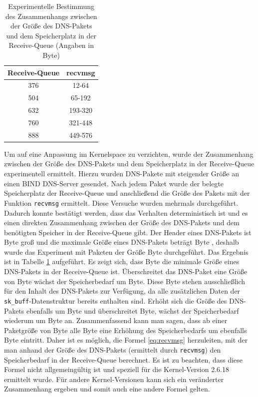 \documentclass[a4paper, 12pt, BCOR10mm, DIV12, toc=bibliography, toc=listof, german]{scrbook}
\begin{document}
		\begin{table}
			\centering
			\begin{tabular}{|c|c|}\hline
				Receive-Queue & recvmsg \\\hline\hline
				376 & 12-64	\\
				504 & 65-192	\\
				632 & 193-320	\\
				760 & 321-448 \\
				888 &	449-576\\\hline
			\end{tabular}
			\caption{Experimentelle Bestimmung des Zusammenhangs zwischen der Größe des DNS-Pakets und dem
			Speicherplatz in der Receive-Queue (Angaben in Byte)}
			\label{tab:recvmsg}
		\end{table}

		Um auf eine Anpassung im Kernelspace zu verzichten, wurde der Zusammenhang zwischen der Größe
		des DNS-Pakets und dem Speicherplatz in der Receive-Queue experimentell ermittelt. Hierzu
		wurden DNS-Pakete mit steigender Größe an einen BIND DNS-Server gesendet. Nach jedem Paket wurde
		der belegte Speicherplatz der Receive-Queue und anschließend die Größe des Pakets mit
		der Funktion \texttt{recvmsg} ermittelt. Diese Versuche wurden mehrmals durchgeführt. Dadurch
		konnte bestätigt werden, dass das Verhalten deterministisch ist und es einen direkten Zusammenhang
		zwischen der Größe des DNS-Pakets und dem benötigten Speicher in der Receive-Queue gibt. Der
		Header eines DNS-Pakets ist \unit[12]{Byte} groß und die maximale Größe eines DNS-Pakets beträgt
		\unit[512]{Byte}
		\cite{rfc1035}, deshalb wurde das Experiment mit Paketen der Größe \unit[12-576]{Byte} durchgeführt. Das
		Ergebnis ist in Tabelle \ref{tab:recvmsg} aufgeführt. Es zeigt sich, dass \unit[376]{Byte} die minimale
		Größe eines DNS-Pakets in der Receive-Queue ist. Überschreitet das DNS-Paket eine Größe von
		\unit[64]{Byte} wächst der Speicherbedarf um \unit[128]{Byte}. Diese \unit[128]{Byte} stehen ausschließlich für den Inhalt
		des DNS-Pakets zur Verfügung, da alle zusätzlichen Daten der \texttt{sk\_buff}-Datenstruktur
		bereits enthalten sind. Erhöht sich die Größe des DNS-Pakets ebenfalls um \unit[128]{Byte} und
		überschreitet \unit[192]{Byte}, wächst der Speicherbedarf wiederum um \unit[128]{Byte} an. Zusammenfassend
		kann man sagen, dass ab einer Paketgröße von \unit[64]{Byte} alle \unit[128]{Byte} eine Erhöhung des
		Speicherbedarfs um ebenfalls \unit[128]{Byte} eintritt. Daher ist es möglich, die Formel \ref{eq:recvmsg}
		herzuleiten, mit der man anhand der Größe des DNS-Pakets (ermittelt durch \texttt{recvmsg}) den
		Speicherbedarf in der Receive-Queue berechnet. Es ist zu beachten, dass diese Formel nicht
		allgemeingültig ist und speziell für die Kernel-Version 2.6.18 ermittelt wurde. Für andere
		Kernel-Versionen kann sich ein veränderter Zusammenhang ergeben und somit auch eine andere
		Formel gelten.
\end{document}
